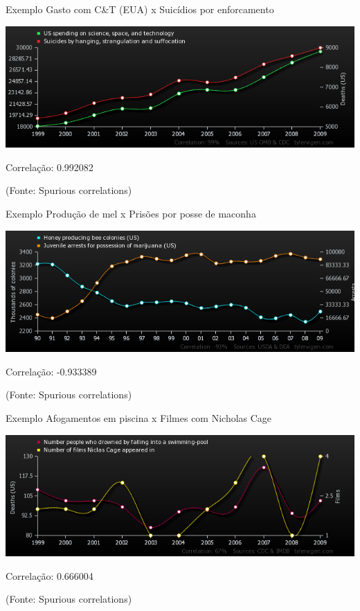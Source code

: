 \documentclass{beamer}
\begin{document}

\begin{frame}{Exemplo}
  Gasto com C\&T (EUA) x Suicídios por enforcamento
  \bigskip

  \includegraphics[width=\textwidth]{Cap17/us-spending-on-science-space-and-technology_suicides-by-hanging-strangulation-and-suffocation}

  \bigskip
  Correlação: 0.992082

  \hfill \scriptsize (Fonte: Spurious correlations)
\end{frame}

\begin{frame}{Exemplo}
  Produção de mel x Prisões por posse de maconha
  \bigskip

  \includegraphics[width=\textwidth]{Cap17/honey-producing-bee-colonies-us_juvenile-arrests-for-possession-of-marijuana-us}

  \bigskip
  Correlação: -0.933389

  \hfill \scriptsize (Fonte: Spurious correlations)
\end{frame}

\begin{frame}{Exemplo}
  Afogamentos em piscina x Filmes com Nicholas Cage
  \bigskip

  \includegraphics[width=\textwidth]{Cap17/number-people-who-drowned-by-falling-into-a-swimming-pool_number-of-films-niclas-cage-appeared-in}

  \bigskip
  Correlação: 0.666004

  \hfill \scriptsize (Fonte: Spurious correlations)
\end{frame}
\end{document}
